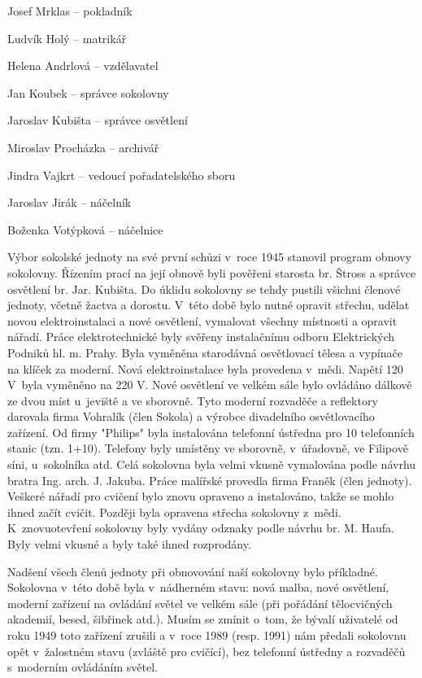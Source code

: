 \documentclass[a5paper, 11pt, twoside]{article}
\begin{document}
Josef Mrklas -- pokladník

Ludvík Holý -- matrikář

Helena Andrlová -- vzdělavatel

Jan Koubek -- správce sokolovny

Jaroslav Kubišta -- správce osvětlení

Miroslav Procházka -- archivář

Jindra Vajkrt -- vedoucí pořadatelského sboru

Jaroslav Jirák -- náčelník

Boženka Votýpková -- náčelnice

Výbor sokolské jednoty na své první schůzi v~roce 1945 stanovil program
obnovy sokolovny. Řízením prací na její obnově byli pověřeni starosta
br. Štross a správce osvětlení br. Jar. Kubišta. Do úklidu sokolovny se
tehdy pustili všichni členové jednoty, včetně žactva a dorostu. V~této
době bylo nutné opravit střechu, udělat novou elektroinstalaci a nové
osvětlení, vymalovat všechny místnosti a opravit nářadí. Práce
elektrotechnické byly svěřeny instalačnímu odboru Elektrických Podniků
hl. m. Prahy. Byla vyměněna starodávná osvětlovací tělesa a vypínače na
klíček za moderní. Nová elektroinstalace byla provedena v~mědi. Napětí
120 V~byla vyměněno na 220 V. Nové osvětlení ve velkém sále bylo
ovládáno dálkově ze dvou míst u~jeviště a ve sborovně. Tyto moderní
rozvaděče a reflektory darovala firma Vohralík (člen Sokola) a výrobce
divadelního osvětlovacího zařízení. Od firmy "Philips" byla instalována
telefonní ústředna pro 10 telefonních stanic (tzn. 1+10). Telefony byly
umístěny ve sborovně, v~úřadovně, ve Filipově síni, u~sokolníka atd.
Celá sokolovna byla velmi vkusně vymalována podle návrhu bratra Ing.
arch. J. Jakuba. Práce malířské provedla firma Franěk (člen jednoty).
Veškeré nářadí pro cvičení bylo znovu opraveno a instalováno, takže se
mohlo ihned začít cvičit. Později byla opravena střecha sokolovny
z~mědi. K~znovuotevření sokolovny byly vydány odznaky podle návrhu br. M.
Haufa. Byly velmi vkusné a byly také ihned rozprodány.

Nadšení všech členů jednoty při obnovování naší sokolovny bylo
příkladné. Sokolovna v~této době byla v~nádherném stavu: nová malba,
nové osvětlení, moderní zařízení na ovládání světel ve velkém sále (při
pořádání tělocvičných akademií, besed, šibřinek atd.). Musím se zmínit
o~tom, že bývalí uživatelé od roku 1949 toto zařízení zrušili a v~roce
1989 (resp. 1991) nám předali sokolovnu opět v~žalostném stavu (zvláště
pro cvičící), bez telefonní ústředny a rozvaděčů s~moderním ovládáním
světel.
\end{document}
